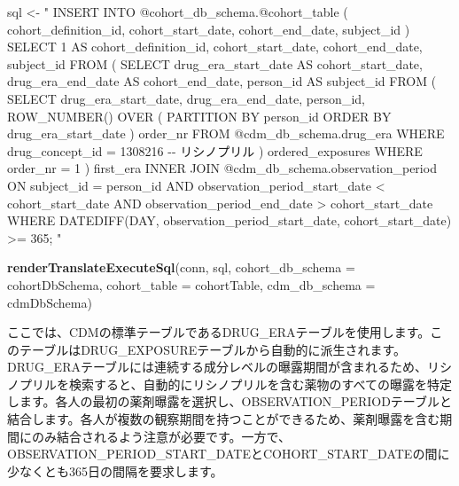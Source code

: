 \documentclass[
  11pt]{book}
\newenvironment{Shaded}{\begin{snugshade}}{\end{snugshade}}
\newcommand{\AttributeTok}[1]{\textcolor[rgb]{0.13,0.29,0.53}{#1}}
\newcommand{\FunctionTok}[1]{\textcolor[rgb]{0.13,0.29,0.53}{\textbf{#1}}}
\newcommand{\NormalTok}[1]{#1}
\newcommand{\OtherTok}[1]{\textcolor[rgb]{0.56,0.35,0.01}{#1}}
\newcommand{\StringTok}[1]{\textcolor[rgb]{0.31,0.60,0.02}{#1}}
\theoremstyle{definition}
\theoremstyle{definition}
\theoremstyle{definition}
\theoremstyle{definition}
\theoremstyle{remark}
\begin{document}
\begin{Shaded}
\begin{Highlighting}[]
\NormalTok{sql }\OtherTok{\textless{}{-}} \StringTok{"}
\StringTok{INSERT INTO @cohort\_db\_schema.@cohort\_table (}
\StringTok{  cohort\_definition\_id,}
\StringTok{  cohort\_start\_date,}
\StringTok{  cohort\_end\_date,}
\StringTok{  subject\_id}
\StringTok{)}
\StringTok{SELECT 1 AS cohort\_definition\_id,}
\StringTok{  cohort\_start\_date,}
\StringTok{  cohort\_end\_date,}
\StringTok{  subject\_id}
\StringTok{FROM (}
\StringTok{  SELECT drug\_era\_start\_date AS cohort\_start\_date,}
\StringTok{    drug\_era\_end\_date AS cohort\_end\_date,}
\StringTok{    person\_id AS subject\_id}
\StringTok{  FROM (}
\StringTok{    SELECT drug\_era\_start\_date,}
\StringTok{      drug\_era\_end\_date,}
\StringTok{      person\_id,}
\StringTok{      ROW\_NUMBER() OVER (}
\StringTok{        PARTITION BY person\_id}
\StringTok{            ORDER BY drug\_era\_start\_date}
\StringTok{      ) order\_nr}
\StringTok{    FROM @cdm\_db\_schema.drug\_era}
\StringTok{    WHERE drug\_concept\_id = 1308216 {-}{-} リシノプリル}
\StringTok{  ) ordered\_exposures}
\StringTok{  WHERE order\_nr = 1}
\StringTok{) first\_era}
\StringTok{INNER JOIN @cdm\_db\_schema.observation\_period}
\StringTok{  ON subject\_id = person\_id}
\StringTok{    AND observation\_period\_start\_date \textless{} cohort\_start\_date}
\StringTok{    AND observation\_period\_end\_date \textgreater{} cohort\_start\_date}
\StringTok{WHERE DATEDIFF(DAY,}
\StringTok{               observation\_period\_start\_date,}
\StringTok{               cohort\_start\_date) \textgreater{}= 365;}
\StringTok{"}

\FunctionTok{renderTranslateExecuteSql}\NormalTok{(conn, sql,}
                          \AttributeTok{cohort\_db\_schema =}\NormalTok{ cohortDbSchema,}
                          \AttributeTok{cohort\_table =}\NormalTok{ cohortTable,}
                          \AttributeTok{cdm\_db\_schema =}\NormalTok{ cdmDbSchema)}
\end{Highlighting}
\end{Shaded}

ここでは、CDMの標準テーブルであるDRUG\_ERAテーブルを使用します。このテーブルはDRUG\_EXPOSUREテーブルから自動的に派生されます。DRUG\_ERAテーブルには連続する成分レベルの曝露期間が含まれるため、リシノプリルを検索すると、自動的にリシノプリルを含む薬物のすべての曝露を特定します。各人の最初の薬剤曝露を選択し、OBSERVATION\_PERIODテーブルと結合します。各人が複数の観察期間を持つことができるため、薬剤曝露を含む期間にのみ結合されるよう注意が必要です。一方で、OBSERVATION\_PERIOD\_START\_DATEとCOHORT\_START\_DATEの間に少なくとも365日の間隔を要求します。
\end{document}
